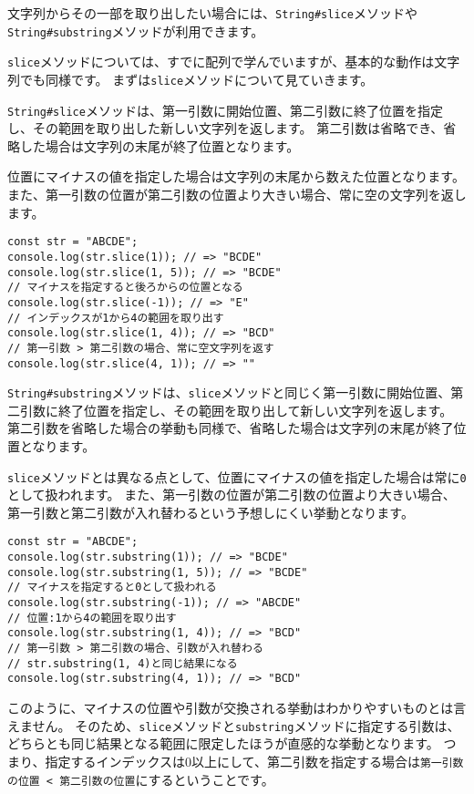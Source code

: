 文字列からその一部を取り出したい場合には、\texttt{String\#slice}メソッドや\texttt{String\#substring}メソッドが利用できます。

\texttt{slice}メソッドについては、すでに配列で学んでいますが、基本的な動作は文字列でも同様です。
まずは\texttt{slice}メソッドについて見ていきます。

\texttt{String\#slice}メソッドは、第一引数に開始位置、第二引数に終了位置を指定し、その範囲を取り出した新しい文字列を返します。
第二引数は省略でき、省略した場合は文字列の末尾が終了位置となります。

位置にマイナスの値を指定した場合は文字列の末尾から数えた位置となります。
また、第一引数の位置が第二引数の位置より大きい場合、常に空の文字列を返します。

\begin{lstlisting}
const str = "ABCDE";
console.log(str.slice(1)); // => "BCDE"
console.log(str.slice(1, 5)); // => "BCDE"
// マイナスを指定すると後ろからの位置となる
console.log(str.slice(-1)); // => "E"
// インデックスが1から4の範囲を取り出す
console.log(str.slice(1, 4)); // => "BCD"
// 第一引数 > 第二引数の場合、常に空文字列を返す
console.log(str.slice(4, 1)); // => ""
\end{lstlisting}

\texttt{String\#substring}メソッドは、\texttt{slice}メソッドと同じく第一引数に開始位置、第二引数に終了位置を指定し、その範囲を取り出して新しい文字列を返します。
第二引数を省略した場合の挙動も同様で、省略した場合は文字列の末尾が終了位置となります。

\texttt{slice}メソッドとは異なる点として、位置にマイナスの値を指定した場合は常に\texttt{0}として扱われます。
また、第一引数の位置が第二引数の位置より大きい場合、第一引数と第二引数が入れ替わるという予想しにくい挙動となります。

\begin{lstlisting}
const str = "ABCDE";
console.log(str.substring(1)); // => "BCDE"
console.log(str.substring(1, 5)); // => "BCDE"
// マイナスを指定すると0として扱われる
console.log(str.substring(-1)); // => "ABCDE"
// 位置:1から4の範囲を取り出す
console.log(str.substring(1, 4)); // => "BCD"
// 第一引数 > 第二引数の場合、引数が入れ替わる
// str.substring(1, 4)と同じ結果になる
console.log(str.substring(4, 1)); // => "BCD"
\end{lstlisting}

このように、マイナスの位置や引数が交換される挙動はわかりやすいものとは言えません。
そのため、\texttt{slice}メソッドと\texttt{substring}メソッドに指定する引数は、どちらとも同じ結果となる範囲に限定したほうが直感的な挙動となります。
つまり、指定するインデックスは0以上にして、第二引数を指定する場合は\texttt{第一引数の位置 < 第二引数の位置}にするということです。

